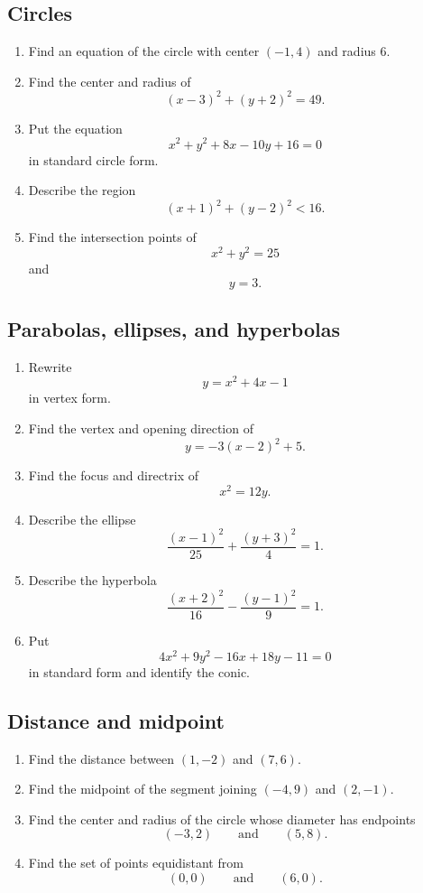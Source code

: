 \subsection*{Circles}

\begin{enumerate}
\item Find an equation of the circle with center \((-1,4)\) and radius \(6\).

\item Find the center and radius of
\[
(x-3)^2+(y+2)^2=49.
\]

\item Put the equation
\[
x^2+y^2+8x-10y+16=0
\]
in standard circle form.

\item Describe the region
\[
(x+1)^2+(y-2)^2<16.
\]

\item Find the intersection points of
\[
x^2+y^2=25
\]
and
\[
y=3.
\]
\end{enumerate}

\subsection*{Parabolas, ellipses, and hyperbolas}

\begin{enumerate}
\item Rewrite
\[
y=x^2+4x-1
\]
in vertex form.

\item Find the vertex and opening direction of
\[
y=-3(x-2)^2+5.
\]

\item Find the focus and directrix of
\[
x^2=12y.
\]

\item Describe the ellipse
\[
\frac{(x-1)^2}{25}+\frac{(y+3)^2}{4}=1.
\]

\item Describe the hyperbola
\[
\frac{(x+2)^2}{16}-\frac{(y-1)^2}{9}=1.
\]

\item Put
\[
4x^2+9y^2-16x+18y-11=0
\]
in standard form and identify the conic.
\end{enumerate}

\subsection*{Distance and midpoint}

\begin{enumerate}
\item Find the distance between \((1,-2)\) and \((7,6)\).

\item Find the midpoint of the segment joining \((-4,9)\) and \((2,-1)\).

\item Find the center and radius of the circle whose diameter has endpoints
\[
(-3,2)
\qquad\text{and}\qquad
(5,8).
\]

\item Find the set of points equidistant from
\[
(0,0)
\qquad\text{and}\qquad
(6,0).
\]
\end{enumerate}

